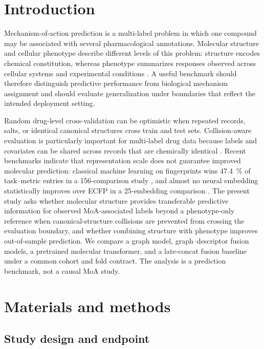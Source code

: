 \documentclass[11pt,a4paper]{article}
\begin{document}
\section{Introduction}

Mechanism-of-action prediction is a multi-label problem in which one compound may be associated with several pharmacological annotations. Molecular structure and cellular phenotype describe different levels of this problem: structure encodes chemical constitution, whereas phenotype summarizes responses observed across cellular systems and experimental conditions \citep{Trapotsi2022MoA}. A useful benchmark should therefore distinguish predictive performance from biological mechanism assignment and should evaluate generalization under boundaries that reflect the intended deployment setting.

Random drug-level cross-validation can be optimistic when repeated records, salts, or identical canonical structures cross train and test sets. Collision-aware evaluation is particularly important for multi-label drug data because labels and covariates can be shared across records that are chemically identical \citep{guo2024scaffold}. Recent benchmarks indicate that representation scale does not guarantee improved molecular prediction: classical machine learning on fingerprints wins \qty{47.4}{\percent} of task--metric entries in a \num{156}-comparison study \citep{guo_ding_2026}, and almost no neural embedding statistically improves over ECFP in a \num{25}-embedding comparison \citep{benchmark_pretrained_2025}. The present study asks whether molecular structure provides transferable predictive information for observed MoA-associated labels beyond a phenotype-only reference when canonical-structure collisions are prevented from crossing the evaluation boundary, and whether combining structure with phenotype improves out-of-sample prediction. We compare a graph model, graph--descriptor fusion models, a pretrained molecular transformer, and a late-concat fusion baseline under a common cohort and fold contract. The analysis is a prediction benchmark, not a causal MoA study.

\section{Materials and methods}

\subsection{Study design and endpoint}
\end{document}

